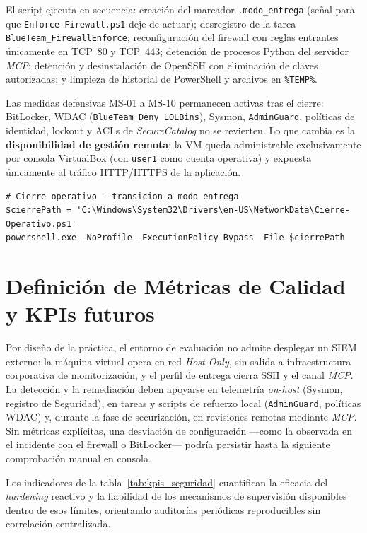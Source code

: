 El script ejecuta en secuencia: creación del marcador \texttt{.modo\_}\allowbreak\texttt{entrega} (señal para que \texttt{Enforce-Firewall.ps1} deje de actuar); desregistro de la tarea \texttt{BlueTeam\_}\allowbreak\texttt{FirewallEnforce}; reconfiguración del firewall con reglas entrantes únicamente en TCP~80 y TCP~443; detención de procesos Python del servidor \textit{MCP}; detención y desinstalación de OpenSSH con eliminación de claves autorizadas; y limpieza de historial de PowerShell y archivos en \texttt{\%TEMP\%}.

Las medidas defensivas MS-01 a MS-10 permanecen activas tras el cierre: BitLocker, WDAC (\texttt{BlueTeam\_}\allowbreak\texttt{Deny\_}\allowbreak\texttt{LOLBins}), Sysmon, \texttt{AdminGuard}, políticas de identidad, lockout y ACLs de \textit{SecureCatalog} no se revierten. Lo que cambia es la \textbf{disponibilidad de gestión remota}: la VM queda administrable exclusivamente por consola VirtualBox (con \texttt{user1} como cuenta operativa) y expuesta únicamente al tráfico HTTP/HTTPS de la aplicación.

\begin{lstlisting}[caption={Invocación del script de cierre operativo.}]
# Cierre operativo - transicion a modo entrega
$cierrePath = 'C:\Windows\System32\Drivers\en-US\NetworkData\Cierre-Operativo.ps1'
powershell.exe -NoProfile -ExecutionPolicy Bypass -File $cierrePath
\end{lstlisting}

\section[Métricas de Calidad y KPIs]{Definición de Métricas de Calidad y KPIs futuros}
\label{sec:metricas_kpis}

Por diseño de la práctica, el entorno de evaluación no admite desplegar un SIEM externo: la máquina virtual opera en red \textit{Host-Only}, sin salida a infraestructura corporativa de monitorización, y el perfil de entrega cierra SSH y el canal \textit{MCP}. La detección y la remediación deben apoyarse en telemetría \textit{on-host} (Sysmon, registro de Seguridad), en tareas y scripts de refuerzo local (\texttt{AdminGuard}, políticas WDAC) y, durante la fase de securización, en revisiones remotas mediante \textit{MCP}. Sin métricas explícitas, una desviación de configuración ---como la observada en el incidente con el firewall o BitLocker--- podría persistir hasta la siguiente comprobación manual en consola.

Los indicadores de la tabla~\ref{tab:kpis_seguridad} cuantifican la eficacia del \textit{hardening} reactivo y la fiabilidad de los mecanismos de supervisión disponibles dentro de esos límites, orientando auditorías periódicas reproducibles sin correlación centralizada.


